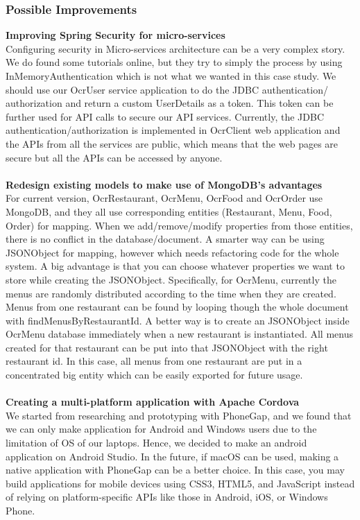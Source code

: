 \documentclass[12pt]{article}
\begin{document}
\begin{multicols}{2}

\subsubsection{Possible Improvements}
\noindent\textbf{Improving Spring Security for micro-services}
\\
Configuring security in Micro-services architecture can be a very complex story. We do found some tutorials online, but they try to simply the process by using InMemoryAuthentication which is not what we wanted in this case study. We should use our OcrUser service application to do the JDBC authentication/ authorization and return a custom UserDetails as a token. This token can be further used for API calls to secure our API services. Currently, the JDBC authentication/authorization is implemented in OcrClient web application and the APIs from all the services are public, which means that the web pages are secure but all the APIs can be accessed by anyone.
\\\\
\noindent\textbf{Redesign existing models to make use of MongoDB's advantages}
\\For current version, OcrRestaurant, OcrMenu, OcrFood and OcrOrder use MongoDB, and they all use corresponding entities (Restaurant, Menu, Food, Order) for mapping. When we add/remove/modify properties from those entities, there is no conflict in the database/document. A smarter way can be using JSONObject for mapping, however which needs refactoring code for the whole system. A big advantage is that you can choose whatever properties we want to store while creating the JSONObject.
Specifically, for OcrMenu, currently the menus are randomly distributed according to the time when they are created. Menus from one restaurant can be found by looping though the whole document with findMenusByRestaurantId. A better way is to create an JSONObject inside OcrMenu database immediately when a new restaurant is instantiated. All menus created for that restaurant can be put into that JSONObject with the right restaurant id. In this case, all menus from one restaurant are put in a concentrated big entity which can be easily exported for future usage. 
\\\\
\noindent\textbf{Creating a multi-platform application with Apache Cordova}
\\
We started from researching and prototyping with PhoneGap, and we found that we can only make application for Android and Windows users due to the limitation of OS of our laptops. Hence, we decided to make an android application on Android Studio. In the future, if macOS can be used, making a native application with PhoneGap can be a better choice. In this case, you may build applications for mobile devices using CSS3, HTML5, and JavaScript instead of relying on platform-specific APIs like those in Android, iOS, or Windows Phone.

\end{multicols}
\end{document}

